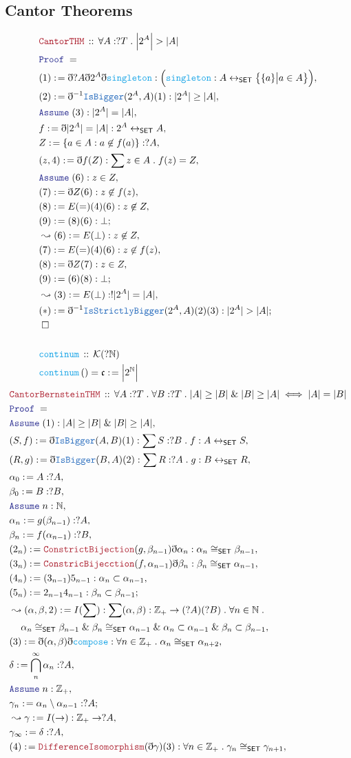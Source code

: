 \documentclass[12pt]{scrartcl}
\newcommand{\TYPE}[1]{\textcolor{NavyBlue}{\mathtt{#1}}}
\newcommand{\FUNC}[1]{\textcolor{Cerulean}{\mathtt{#1}}}
\newcommand{\LOGIC}[1]{\textcolor{Blue}{\mathtt{#1}}}
\newcommand{\THM}[1]{\textcolor{Maroon}{\mathtt{#1}}}
\renewcommand{\.}{\; . \;}
\newcommand{\de}{: \kern 0.1pc =}
\newcommand{\Act}[1]{\left( #1 \right)}
\newcommand{\Theorem}[2]{& \THM{#1} \, :: \, #2 \\ & \Proof = \\ }
\newcommand{\DeclareFunc}[2]{& \FUNC{#1} \, :: \, #2 \\}
\newcommand{\DefineNamedFunc}[4]{&  \FUNC{#1}\Act{#2} = #3 \de #4 \\}
\newcommand{\NewLine}{\\ & \kern 1pc}
\newcommand{\Page}[1]{ \begin{align*} #1 \end{align*}   }
\newcommand{ \bd }{ \ByDef }
\renewcommand{\And}{\; \& \;}
\newcommand{\NNInt}{\mathbb{Z}_{+} }
\newcommand{\Nat}{\mathbb{N} }
\newcommand{\ToBij}{\leftrightarrow}
\newcommand{\Say}[3]{& #1 \de #2 : #3, \\}
\newcommand{\Conclude}[3]{& #1 \de #2 : #3; \\}
\newcommand{\Derive}[3]{& \leadsto #1 \de #2 : #3, \\}
\newcommand{\A}{\LOGIC{Assume} \;}
\newcommand{\Assume}[2]{& \A #1 : #2, \\}
\newcommand{\QED}{\; \square}
\newcommand{\EndProof}{& \QED \\}
\newcommand{\ByDef}{\eth}
\newcommand{\Proof}{\LOGIC{Proof} \; }
\newcommand{\SET}{\mathsf{SET}}
\begin{document}
\subsection{Cantor Theorems}
\Page{
	\Theorem{CantorTHM}{\forall A : ?T \. \Big|2^A\Big| > |A| }
	\Say{(1)}{\bd ?A \bd 2^A \bd \FUNC{singleton}}{\Big( \FUNC{singleton} : A \ToBij_{\SET} 
		\big\{ \{a\}  \big| a \in A  \big\} \Big)}
	\Say{(2)}{\bd^{-1} \TYPE{IsBigger}(2^A,A)(1)}{ |2^A| \ge |A| }
	\Assume{(3)}{ |2^A| = |A| }
	\Say{f}{\bd |2^A| = |A|}{ 2^A \ToBij_{\SET} A}
	\Say{Z}{ \{ a \in A : a \not \in f(a)  \} }{ ?A }
	\Say{(z,4)}{\bd f (Z)}{\sum z \in A \. f(z) = Z}
	\Assume{(6)}{z \in Z}
	\Say{(7)}{\bd Z(6)}{z \not \in f(z)}
	\Say{(8)}{E(=)(4)(6)}{z \not \in Z}
	\Conclude{(9)}{(8)(6) }{\bot}
	\Derive{(6)}{E(\bot)}{ z \not \in Z}
	\Say{(7)}{E(=)(4)(6)}{z \not \in f(z)}
	\Say{(8)}{\bd Z (7)}{z \in Z}
	\Conclude{(9)}{(6)(8)}{\bot}
	\Derive{(3)}{E(\bot)}{!|2^A| = |A| }
	\Conclude{(*)}{\bd^{-1} \TYPE{IsStrictlyBigger}(2^A,A)(2)(3)}{|2^A| > |A|}
	\EndProof
	\\
	\DeclareFunc{continum}{\mathcal{K}(?\Nat)}
	\DefineNamedFunc{continum}{}{\mathfrak{c}}{\Big|2^\Nat \Big|}
	} \Page{
	\Theorem{CantorBernsteinTHM}{\forall A : ?T \. \forall B : ?T \. 
		|A| \ge |B| \And |B| \ge |A| \iff |A| = |B|}
	\Assume{(1)}{|A| \ge |B| \And |B| \ge |A|}
	\Say{(S,f)}{ \bd\TYPE{IsBigger}(A,B)(1)}{ \sum S : ?B \. f : A \ToBij_{\SET} S }
	\Say{(R,g)}{ \bd\TYPE{IsBigger}(B,A)(2)}{\sum R : ?A \. g : B \ToBij_{\SET} R}
	\Say{\alpha_0}{A}{?A}
	\Say{\beta_0}{B}{?B}
	\Assume{n}{\Nat}
	\Say{\alpha_n}{g(\beta_{n-1})}{?A}
	\Say{\beta_n}{f(\alpha_{n-1})}{?B}
	\Say{(2_n)}{\THM{ConstrictBijection}(g,\beta_{n-1})\bd \alpha_n}{ \alpha_n \cong_{\SET} \beta_{n-1}}
	\Say{(3_n)}{\THM{ConstricBijecction}(f,\alpha_{n-1})\bd \beta_n}{\beta_n \cong_{\SET} \alpha_{n-1}}
	\Say{(4_n)}{(3_{n-1})5_{n-1}  }{\alpha_n \subset \alpha_{n-1}}
	\Conclude{(5_n)}{2_{n-1}4_{n-1}}{\beta_n \subset \beta_{n-1}}
	\Derive{(\alpha,\beta,2)}{I(\sum)}{\sum (\alpha,\beta) : \NNInt \to (?A)(?B) \. \forall n \in \Nat \. 
		\NewLine
		\alpha_n \cong_{\SET} \beta_{n-1} \And \beta_n \cong_{\SET} \alpha_{n-1}  \And   
		\alpha_n \subset \alpha_{n-1} \And \beta_{n} \subset \beta_{n - 1}
		}
	\Say{(3)}{\bd(\alpha,\beta)\bd \FUNC{compose}}{\forall n \in \NNInt \. \alpha_n \cong_{\SET} \alpha_{n + 2}}
	\Say{\delta}{\bigcap_{n}^\infty \alpha_n }{?A}
	\Assume{n}{\NNInt}
	\Conclude{\gamma_n}{\alpha_n \setminus \alpha_{n-1}}{?A}
	\Derive{\gamma}{I(\to)}{ \NNInt \to ?A}
	\Say{\gamma_\infty}{\delta}{?A}
	\Say{(4)}{\THM{DifferenceIsomorphism}(\bd \gamma)(3)}{\forall n \in \NNInt \. \gamma_n \cong_{\SET} \gamma_{n + 1}}
}
\end{document}
